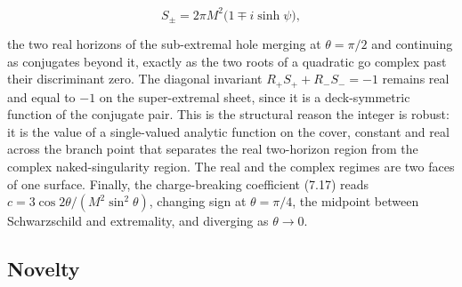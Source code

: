 \documentclass[11pt]{article}
\begin{document}
\begin{equation*}
S_\pm = 2\pi M^2\big(1 \mp i\sinh\psi\big),
\tag{7.22}
\end{equation*}

the two real horizons of the sub-extremal hole merging at $\theta = \pi/2$ and continuing as conjugates beyond it, exactly as the two roots of a quadratic go complex past their discriminant zero. The diagonal invariant $R_+S_+ + R_-S_- = -1$ remains real and equal to $-1$ on the super-extremal sheet, since it is a deck-symmetric function of the conjugate pair. This is the structural reason the integer is robust: it is the value of a single-valued analytic function on the cover, constant and real across the branch point that separates the real two-horizon region from the complex naked-singularity region. The real and the complex regimes are two faces of one surface. Finally, the charge-breaking coefficient (7.17) reads $c = 3\cos 2\theta / (M^2\sin^2\theta)$, changing sign at $\theta = \pi/4$, the midpoint between Schwarzschild and extremality, and diverging as $\theta \to 0$.

\subsection{Novelty}
\end{document}
